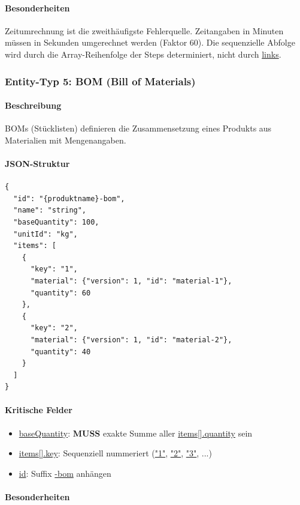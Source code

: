 \paragraph{Besonderheiten}

Zeitumrechnung ist die zweithäufigste Fehlerquelle. Zeitangaben in Minuten müssen in Sekunden umgerechnet werden (Faktor 60). Die sequenzielle Abfolge wird durch die Array-Reihenfolge der Steps determiniert, nicht durch \url{links}.

\subsubsection{Entity-Typ 5: BOM (Bill of Materials)}

\paragraph{Beschreibung}

BOMs (Stücklisten) definieren die Zusammensetzung eines Produkts aus Materialien mit Mengenangaben.

\paragraph{JSON-Struktur}

\begin{verbatim}
{
  "id": "{produktname}-bom",
  "name": "string",
  "baseQuantity": 100,
  "unitId": "kg",
  "items": [
    {
      "key": "1",
      "material": {"version": 1, "id": "material-1"},
      "quantity": 60
    },
    {
      "key": "2",
      "material": {"version": 1, "id": "material-2"},
      "quantity": 40
    }
  ]
}
\end{verbatim}

\paragraph{Kritische Felder}

\begin{itemize}
    \item \url{baseQuantity}: \textbf{MUSS} exakte Summe aller \url{items[].quantity} sein
    \item \url{items[].key}: Sequenziell nummeriert (\url{"1"}, \url{"2"}, \url{"3"}, ...)
    \item \url{id}: Suffix \url{-bom} anhängen
\end{itemize}

\paragraph{Besonderheiten}

